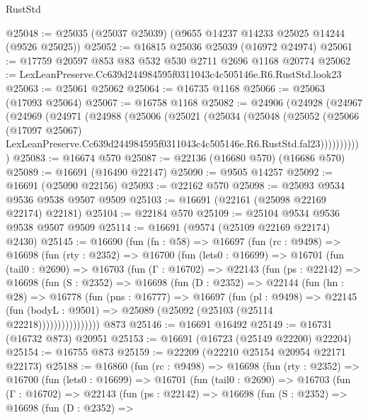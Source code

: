 \begin{lexlean}{RustStd}
\begin{coremodule}
@25048 := @25035 (@25037 @25039) (@9655 @14237 @14233 @25025 @14244 (@9526 @25025))
@25052 := @16815 @25036 @25039 (@16972 @24974)
@25061 := @17759 @20597 @853 @83 @532 @530 @2711 @2696 @1168 @20774
@25062 := LexLeanPreserve.Cc639d244984595f0311043c4c505146e.R6.RustStd.look23
@25063 := @25061 @25062
@25064 := @16735 @1168
@25066 := @25063 (@17093 @25064)
@25067 := @16758 @1168
@25082 := @24906
    (@24928
      (@24967
        (@24969
          (@24971
            (@24988
              (@25006
                (@25021
                  (@25034
                    (@25048
                      (@25052
                        (@25066
                          (@17097 @25067)
                          LexLeanPreserve.Cc639d244984595f0311043c4c505146e.R6.RustStd.fal23)))))))))))
@25083 := @16674 @570
@25087 := @22136 (@16680 @570) (@16686 @570)
@25089 := @16691 (@16490 @22147)
@25090 := @9505 @14257
@25092 := @16691 (@25090 @22156)
@25093 := @22162 @570
@25098 := @25093 @9534 @9536 @9538 @9507 @9509
@25103 := @16691 (@22161 (@25098 @22169 @22174) @22181)
@25104 := @22184 @570
@25109 := @25104 @9534 @9536 @9538 @9507 @9509
@25114 := @16691 (@9574 (@25109 @22169 @22174) @2430)
@25145 := @16690
    (fun (fn : @58) =>
    @16697
      (fun (rc : @9498) =>
      @16698
        (fun (rty : @2352) =>
        @16700
          (fun (lets0 : @16699) =>
          @16701
            (fun (tail0 : @2690) =>
            @16703
              (fun (Γ : @16702) =>
              @22143
                (fun (ps : @22142) =>
                @16698
                  (fun (S : @2352) =>
                  @16698
                    (fun (D : @2352) =>
                    @22144
                      (fun (hn : @28) =>
                      @16778
                        (fun (pns : @16777) =>
                        @16697
                          (fun (pl : @9498) =>
                          @22145
                            (fun (bodyL : @9501) =>
                            @25089 (@25092 (@25103 (@25114 @22218))))))))))))))))
    @873
@25146 := @16691 @16492
@25149 := @16731 (@16732 @873) @20951
@25153 := @16691 (@16723 (@25149 @22200) @22204)
@25154 := @16755 @873
@25159 := @22209 (@22210 @25154 @20954 @22171 @22173)
@25188 := @16860
    (fun (rc : @9498) =>
    @16698
      (fun (rty : @2352) =>
      @16700
        (fun (lets0 : @16699) =>
        @16701
          (fun (tail0 : @2690) =>
          @16703
            (fun (Γ : @16702) =>
            @22143
              (fun (ps : @22142) =>
              @16698
                (fun (S : @2352) =>
                @16698
                  (fun (D : @2352) =>

\end{coremodule}
\end{lexlean}
